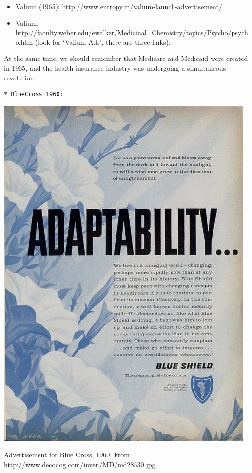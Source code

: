 \begin{refsection}
\begin{itemize}
\item Valium (1965): http:\slash \slash www.entropy.in\slash valium-launch-advertisement\slash  

\item Valium: http:\slash \slash faculty.weber.edu\slash ewalker\slash Medicinal\_Chemistry\slash topics\slash Psycho\slash psycho.htm (look for `Valium Ads', there are three links).

\end{itemize}

At the same time, we should remember that Medicare and Medicaid were created in 1965, and the health insurance industry was undergoing a simultaneous revolution: 

\begin{verbatim}
* BlueCross 1960: 
\end{verbatim}

\begin{marginfigure}
 \begin{center}


     \includegraphics[scale=0.25]{../images/md28530.jpg}
\end{center}
 \caption{Advertisement for Blue Cross, 1960. From http://www.decodog.com/inven/MD/md28530.jpg }
\label{fig: BlueCross}
\end{marginfigure}



\end{refsection}
